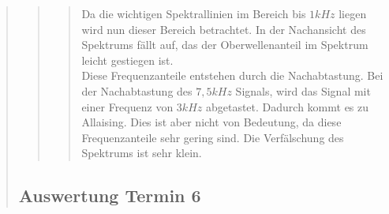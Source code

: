 \begin{quote}
\begin{quote}
\begin{quote}
            Da die wichtigen Spektrallinien im Bereich bis $1kHz$ liegen wird nun dieser Bereich betrachtet. In der
            Nachansicht des Spektrums fällt auf, das der Oberwellenanteil im Spektrum leicht gestiegen ist.\\
            Diese Frequenzanteile entstehen durch die Nachabtastung. Bei der Nachabtastung des $7,5kHz$ Signals, wird
            das Signal mit einer Frequenz von $3kHz$ abgetastet. Dadurch kommt es zu Allaising. Dies ist aber nicht von
            Bedeutung, da diese Frequenzanteile sehr gering sind. Die Verfälschung des Spektrums ist sehr klein.
			
		\end{quote} %
    \end{quote}  %
    
    \subsection{Auswertung Termin 6}
    \begin{quote}
    

\end{quote}
\end{quote}
